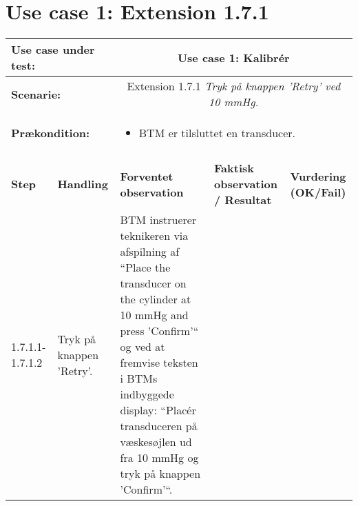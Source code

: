 \section{Use case 1: Extension 1.7.1}
\begin{tabular}{|p{1cm}|p{3cm}|p{4cm}|p{4cm}|p{2cm}|}
\hline
\multicolumn{2}{|p{3cm}|}{\textbf{Use case under test:}} & \multicolumn{3}{c|}{Use case 1: Kalibrér } \\\hline

\multicolumn{2}{|p{3cm}|}{\textbf{Scenarie:}} & \multicolumn{3}{c|}{Extension 1.7.1 \textit{Tryk på knappen 'Retry' ved 10 mmHg.}} \\\hline
\multicolumn{2}{|p{3cm}|}{\textbf{Prækondition:}}  & \multicolumn{3}{l|}{\parbox{0.6\textwidth}{
\begin{itemize}[label=$\circ$]
\item BTM er tilsluttet en transducer. 
\end{itemize} }}\\\hline

\multicolumn{5}{|c|}{} \\\hline

\textbf{Step} & \textbf{Handling} & \textbf{Forventet observation} & \textbf{Faktisk observation / Resultat} & \textbf{Vurdering (OK/Fail)}\\\hline

1.7.1.1-1.7.1.2 & Tryk på knappen 'Retry'. & BTM instruerer teknikeren via afspilning af “Place the
transducer on the cylinder at 10 mmHg and press ’Confirm’“
og ved at fremvise teksten i BTMs indbyggede
display: “Placér transduceren på væskesøjlen ud fra
10 mmHg og tryk på knappen ’Confirm’“. & & \\\hline

\end{tabular}


